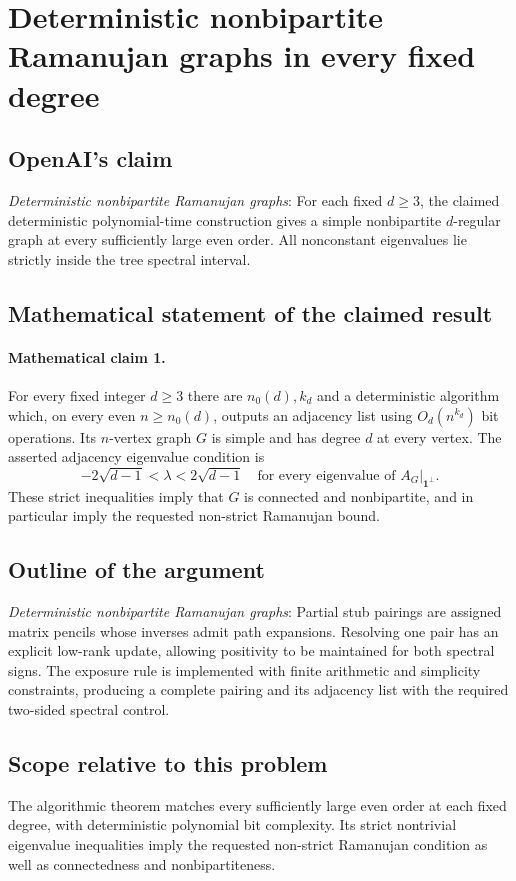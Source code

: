 \documentclass[11pt]{article}
\begin{document}
\section*{Deterministic nonbipartite Ramanujan graphs in every fixed degree}

\subsection{OpenAI's claim}
\textit{Deterministic nonbipartite Ramanujan graphs}: For each fixed $d\ge3$, the claimed deterministic polynomial-time construction gives a simple nonbipartite $d$-regular graph at every sufficiently large even order. All nonconstant eigenvalues lie strictly inside the tree spectral interval.

\subsection{Mathematical statement of the claimed result}
\paragraph{Mathematical claim 1.} For every fixed integer $d\ge3$ there are $n_0(d),k_d$ and a deterministic algorithm which, on every even $n\ge n_0(d)$, outputs an adjacency list using $O_d(n^{k_d})$ bit operations. Its $n$-vertex graph $G$ is simple and has degree $d$ at every vertex. The asserted adjacency eigenvalue condition is \[-2\sqrt{d-1}<\lambda<2\sqrt{d-1}\quad\text{for every eigenvalue of }A_G|_{\mathbf1^\perp}.\] These strict inequalities imply that $G$ is connected and nonbipartite, and in particular imply the requested non-strict Ramanujan bound.

\subsection{Outline of the argument}
\textit{Deterministic nonbipartite Ramanujan graphs}: Partial stub pairings are assigned matrix pencils whose inverses admit path expansions. Resolving one pair has an explicit low-rank update, allowing positivity to be maintained for both spectral signs. The exposure rule is implemented with finite arithmetic and simplicity constraints, producing a complete pairing and its adjacency list with the required two-sided spectral control.

\subsection{Scope relative to this problem}
The algorithmic theorem matches every sufficiently large even order at each fixed degree, with deterministic polynomial bit complexity. Its strict nontrivial eigenvalue inequalities imply the requested non-strict Ramanujan condition as well as connectedness and nonbipartiteness.
\end{document}
